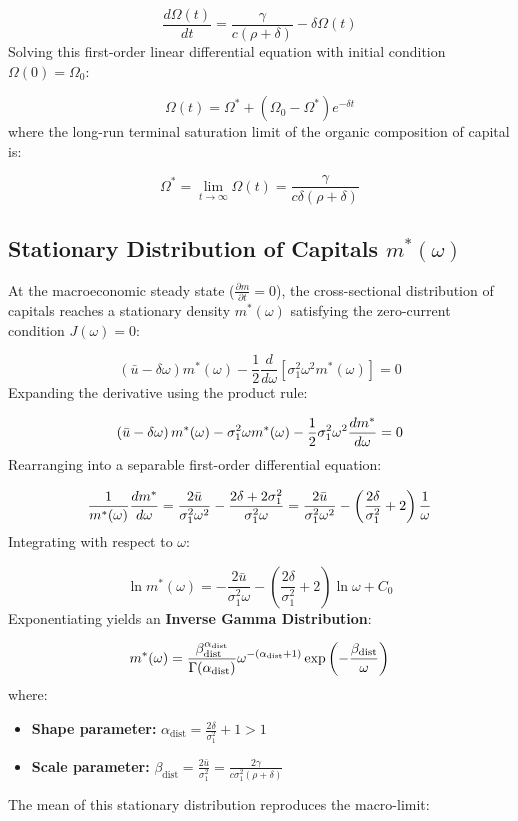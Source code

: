 \documentclass[11pt,letterpaper]{report}
\newcommand{\fitmath}[1]{\begingroup\setbox0=\hbox{$\displaystyle #1$}\ifdim\wd0>\linewidth\resizebox{\linewidth}{!}{$\displaystyle #1$}\else\displaystyle #1\fi\endgroup}
\begin{document}
\[
\frac{d\Omega (t)}{dt}=\frac{\gamma }{c(\rho +\delta )}-\delta \Omega (t)
\]
Solving this first-order linear differential equation with initial condition $\Omega (0)={\Omega }_{0}$:

\[
\Omega (t)={\Omega }^{*}+\left({{\Omega }_{0}-{\Omega }^{*}}\right){e}^{-\delta t}
\]
where the long-run terminal saturation limit of the organic composition of capital is:

\[
{\Omega }^{*}=\lim\limits_{{t} \rightarrow {\infty }}\Omega (t)=\frac{\gamma }{c\delta (\rho +\delta )}
\]
\subsection{Stationary Distribution of Capitals \texorpdfstring{$m^*(\omega)$}{m*(omega)}}
At the macroeconomic steady state ($\frac{\partial m}{\partial t}=0$), the cross-sectional distribution of capitals reaches a stationary density ${m}^{*}(\omega )$ satisfying the zero-current condition $J(\omega )=0$:

\[
\left({\bar{u}-\delta \omega }\right){m}^{*}(\omega )-\frac{1}{2}\frac{d}{d\omega }\left[{{\sigma }_{1}^{2}{\omega }^{2}{m}^{*}(\omega )}\right]=0
\]
Expanding the derivative using the product rule:

\[\fitmath{\left({\bar{u}-\delta \omega }\right){m}^{*}(\omega )-{\sigma }_{1}^{2}\omega {m}^{*}(\omega )-\frac{1}{2}{\sigma }_{1}^{2}{\omega }^{2}\frac{d{m}^{*}}{d\omega }=0}\]
Rearranging into a separable first-order differential equation:

\[\fitmath{\frac{1}{{m}^{*}(\omega )}\frac{d{m}^{*}}{d\omega }=\frac{2\bar{u}}{{\sigma }_{1}^{2}{\omega }^{2}}-\frac{2\delta +2{\sigma }_{1}^{2}}{{\sigma }_{1}^{2}\omega }=\frac{2\bar{u}}{{\sigma }_{1}^{2}{\omega }^{2}}-\left({\frac{2\delta }{{\sigma }_{1}^{2}}+2}\right)\frac{1}{\omega }}\]
Integrating with respect to $\omega$:

\[
\ln {m}^{*}(\omega )=-\frac{2\bar{u}}{{\sigma }_{1}^{2}\omega }-\left({\frac{2\delta }{{\sigma }_{1}^{2}}+2}\right)\ln \omega +{C}_{0}
\]
Exponentiating yields an \textbf{Inverse Gamma Distribution}:

\[\fitmath{m^*(\omega) = \frac{\beta_{\text{dist}}^{\alpha_{\text{dist}}}}{\Gamma(\alpha_{\text{dist}})} \omega^{-(\alpha_{\text{dist}} + 1)} \exp\left( -\frac{\beta_{\text{dist}}}{\omega} \right)}\]
where:

\begin{itemize}
\item \textbf{Shape parameter:} ${\alpha }_{\mathrm{dist}}=\frac{2\delta }{{\sigma }_{1}^{2}}+1>1$
\item \textbf{Scale parameter:} ${\beta }_{\mathrm{dist}}=\frac{2\bar{u}}{{\sigma }_{1}^{2}}=\frac{2\gamma }{c{\sigma }_{1}^{2}(\rho +\delta )}$
\end{itemize}
The mean of this stationary distribution reproduces the macro-limit:
\end{document}

